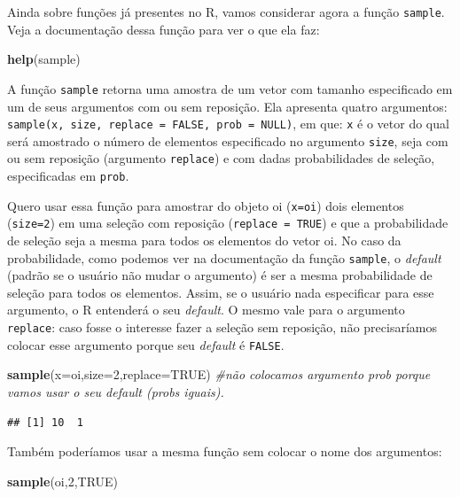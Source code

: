 \documentclass[
]{book}
\newenvironment{Shaded}{\begin{snugshade}}{\end{snugshade}}
\newcommand{\CommentTok}[1]{\textcolor[rgb]{0.56,0.35,0.01}{\textit{#1}}}
\newcommand{\DataTypeTok}[1]{\textcolor[rgb]{0.13,0.29,0.53}{#1}}
\newcommand{\DecValTok}[1]{\textcolor[rgb]{0.00,0.00,0.81}{#1}}
\newcommand{\KeywordTok}[1]{\textcolor[rgb]{0.13,0.29,0.53}{\textbf{#1}}}
\newcommand{\NormalTok}[1]{#1}
\newcommand{\OtherTok}[1]{\textcolor[rgb]{0.56,0.35,0.01}{#1}}
\begin{document}
Ainda sobre funções já presentes no R, vamos considerar agora a função \texttt{sample}. Veja a documentação dessa função para ver o que ela faz:

\begin{Shaded}
\begin{Highlighting}[]
\KeywordTok{help}\NormalTok{(sample)}
\end{Highlighting}
\end{Shaded}

A função \texttt{sample} retorna uma amostra de um vetor com tamanho especificado em um de seus argumentos com ou sem reposição. Ela apresenta quatro argumentos: \texttt{sample(x,\ size,\ replace\ =\ FALSE,\ prob\ =\ NULL)}, em que: \texttt{x} é o vetor do qual será amostrado o número de elementos especificado no argumento \texttt{size}, seja com ou sem reposição (argumento \texttt{replace}) e com dadas probabilidades de seleção, especificadas em \texttt{prob}.

Quero usar essa função para amostrar do objeto oi (\texttt{x=oi}) dois elementos (\texttt{size=2}) em uma seleção com reposição (\texttt{replace\ =\ TRUE}) e que a probabilidade de seleção seja a mesma para todos os elementos do vetor oi. No caso da probabilidade, como podemos ver na documentação da função \texttt{sample}, o \emph{default} (padrão se o usuário não mudar o argumento) é ser a mesma probabilidade de seleção para todos os elementos. Assim, se o usuário nada especificar para esse argumento, o R entenderá o seu \emph{default}. O mesmo vale para o argumento \texttt{replace}: caso fosse o interesse fazer a seleção sem reposição, não precisaríamos colocar esse argumento porque seu \emph{default} é \texttt{FALSE}.

\begin{Shaded}
\begin{Highlighting}[]
\KeywordTok{sample}\NormalTok{(}\DataTypeTok{x=}\NormalTok{oi,}\DataTypeTok{size=}\DecValTok{2}\NormalTok{,}\DataTypeTok{replace=}\OtherTok{TRUE}\NormalTok{) }\CommentTok{#não colocamos argumento prob porque vamos usar o seu default (probs iguais).}
\end{Highlighting}
\end{Shaded}

\begin{verbatim}
## [1] 10  1
\end{verbatim}

Também poderíamos usar a mesma função sem colocar o nome dos argumentos:

\begin{Shaded}
\begin{Highlighting}[]
\KeywordTok{sample}\NormalTok{(oi,}\DecValTok{2}\NormalTok{,}\OtherTok{TRUE}\NormalTok{) }
\end{Highlighting}
\end{Shaded}
\end{document}
